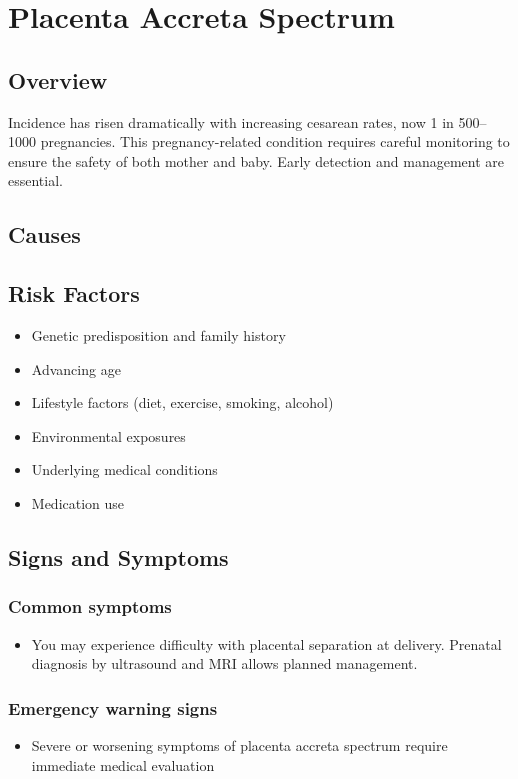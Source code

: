 \chapter{Placenta Accreta Spectrum}
\label{sec:Placenta Accreta Spectrum}

\section{Overview}
Incidence has risen dramatically with increasing cesarean rates, now 1 in 500--1000 pregnancies. This pregnancy-related condition requires careful monitoring to ensure the safety of both mother and baby. Early detection and management are essential.
\section{Causes}
\section{Risk Factors}

\begin{itemize}[noitemsep]
  \item Genetic predisposition and family history
  \item Advancing age
  \item Lifestyle factors (diet, exercise, smoking, alcohol)
  \item Environmental exposures
  \item Underlying medical conditions
  \item Medication use
\end{itemize}
\section{Signs and Symptoms}

\subsection{Common symptoms}
\begin{itemize}[noitemsep]
  \item You may experience difficulty with placental separation at delivery. Prenatal diagnosis by ultrasound and MRI allows planned management. 
  \end{itemize}

\subsection{Emergency warning signs}
\begin{itemize}[noitemsep]
  \item Severe or worsening symptoms of placenta accreta spectrum require immediate medical evaluation
\end{itemize}
